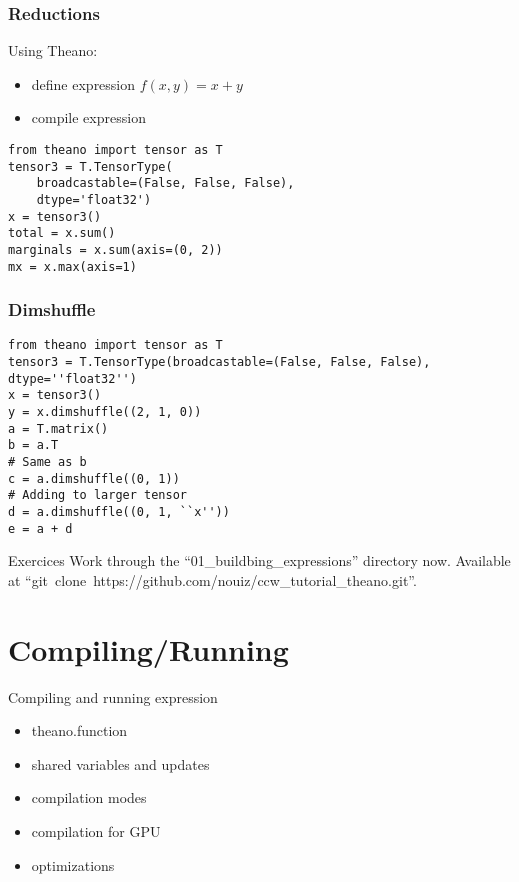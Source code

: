 \documentclass[utf8x,xcolor=pdftex,dvipsnames,table]{beamer}
\begin{document}
\begin{frame}[fragile]
  \frametitle{Reductions}
  Using Theano:
  \begin{itemize}
  \item define expression $f(x,y) = x + y$
  \item compile expression
  \end{itemize}
\begin{lstlisting}
from theano import tensor as T
tensor3 = T.TensorType(
    broadcastable=(False, False, False),
    dtype='float32')
x = tensor3()
total = x.sum()
marginals = x.sum(axis=(0, 2))
mx = x.max(axis=1)
\end{lstlisting}
\end{frame}

\begin{frame}[fragile]
  \frametitle{Dimshuffle}

\begin{lstlisting}
from theano import tensor as T
tensor3 = T.TensorType(broadcastable=(False, False, False), dtype=''float32'')
x = tensor3()
y = x.dimshuffle((2, 1, 0))
a = T.matrix()
b = a.T
# Same as b
c = a.dimshuffle((0, 1))
# Adding to larger tensor
d = a.dimshuffle((0, 1, ``x''))
e = a + d
\end{lstlisting}
\end{frame}

\begin{frame}{Exercices}
  Work through the ``01\_buildbing\_expressions'' directory now.
  Available at ``git~clone~https://github.com/nouiz/ccw\_tutorial\_theano.git''.
\end{frame}

\section{Compiling/Running}
\begin{frame}{Compiling and running expression}
  \begin{itemize}
  \item theano.function
  \item shared variables and updates
  \item compilation modes
  \item compilation for GPU
  \item optimizations
  \end{itemize}
\end{frame}
\end{document}

